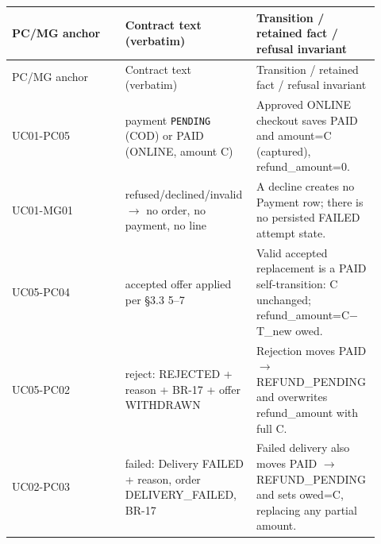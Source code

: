 \begin{longtable}{>{\raggedright\arraybackslash}p{0.3067\linewidth}>{\raggedright\arraybackslash}p{0.3067\linewidth}>{\raggedright\arraybackslash}p{0.3067\linewidth}}
PC/MG anchor & Contract text (verbatim) & Transition / retained fact / refusal invariant \\
\hline\endfirsthead
PC/MG anchor & Contract text (verbatim) & Transition / retained fact / refusal invariant \\
\hline\endhead
UC01-PC05 & payment \texttt{PENDING} (COD) or PAID (ONLINE, amount C) & Approved ONLINE checkout saves PAID and amount=C (captured), refund\_amount=0. \\
UC01-MG01 & refused/declined/invalid \ensuremath{\rightarrow} no order, no payment, no line & A decline creates no Payment row; there is no persisted FAILED attempt state. \\
UC05-PC04 & accepted offer applied per \S{}3.3 5--7 & Valid accepted replacement is a PAID self-transition: C unchanged; refund\_amount=C\ensuremath{-}T\_new owed. \\
UC05-PC02 & reject: REJECTED + reason + BR-17 + offer WITHDRAWN & Rejection moves PAID \ensuremath{\rightarrow} REFUND\_PENDING and overwrites refund\_amount with full C. \\
UC02-PC03 & failed: Delivery FAILED + reason, order DELIVERY\_FAILED, BR-17 & Failed delivery also moves PAID \ensuremath{\rightarrow} REFUND\_PENDING and sets owed=C, replacing any partial amount. \\
\end{longtable}
